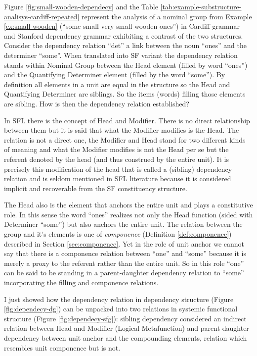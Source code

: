 Figure \ref{fig:small-wooden-dependecy} and the Table \ref{tab:example-substructure-analisys-cardiff-repeated} represent the analysis of a nominal group from Example \ref{ex:small-wooden} (``some small very small wooden ones'') in Cardiff grammar and Stanford dependency grammar exhibiting a contrast of the two structures. Consider the dependency relation ``det'' a link between the noun ``ones'' and the determiner ``some''. When translated into SF variant the dependency relation stands within Nominal Group between the Head element (filled by word ``ones'') and the Quantifying Determiner element (filled by the word ``some''). By definition all elements in a unit are equal in the structure so the Head and Quantifying Determiner are siblings. So the items (words) filling those elements are sibling. How is then the dependency relation established? 

In SFL there is the concept of Head and Modifier. There is no direct relationship between them but it is said that what the Modifier modifies is the Head. The relation is not a direct one, the Modifier and Head stand for two different kinds of meaning and what the Modifier modifies is not the Head per se but the referent denoted by the head (and thus construed by the entire unit). It is precisely this modification of the head that is called a (sibling) dependency relation and is seldom mentioned in SFL literature because it is considered implicit and recoverable from the SF constituency structure.

The Head also is the element that anchors the entire unit and plays a constitutive role. In this sense the word ``ones'' realizes not only the Head function (sided with Determiner ``some'') but also anchors the entire unit. The relation between the group and it's elements is one of \textit{componence} (Definition \ref{def:componence}) described in Section \ref{sec:componence}. Yet in the role of unit anchor we cannot say that there is a componence relation between ``one'' and ``some'' because it is merely a proxy to the referent rather than the entire unit. So in this role ``one'' can be said to be standing in a parent-daughter dependency relation to ``some'' incorporating the filling and componence relations.

I just showed how the dependency relation in dependency structure (Figure \ref{fig:dependecy-dg}) can be unpacked into two relations in systemic functional structure (Figure \ref{fig:dependecy-sfg}): sibling dependency considered an indirect relation between Head and Modifier (Logical Metafunction) and parent-daughter dependency between unit anchor and the compounding elements, relation which resembles unit componence but is not. 

